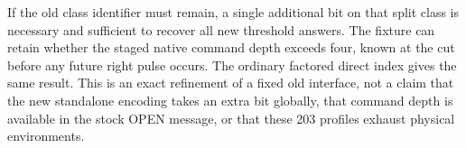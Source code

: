 \documentclass{article}
\begin{document}
If the old class identifier must remain, a single additional bit on
that split class is necessary and sufficient to recover all new
threshold answers. The fixture can retain whether the staged native
command depth exceeds four, known at the cut before any future
right pulse occurs. The ordinary factored direct index gives the
same result. This is an exact refinement of a fixed old interface,
not a claim that the new standalone encoding takes an extra bit
globally, that command depth is available in the stock OPEN message,
or that these 203 profiles exhaust physical environments.
\end{document}
